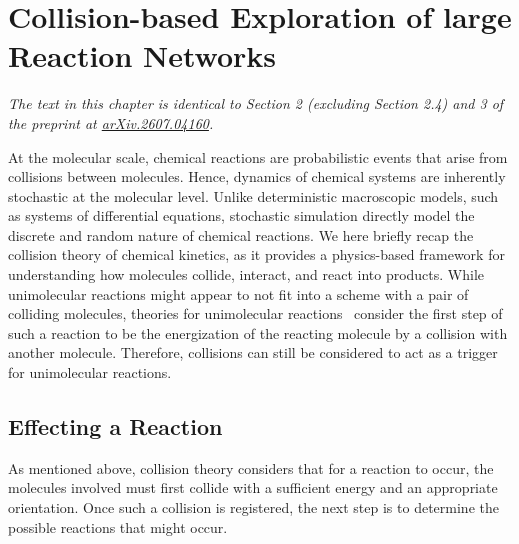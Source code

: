 \chapter[Exploring large Reaction Networks]{Collision-based Exploration of large Reaction Networks}
\label{ch:stoc_explore} %

{\sffamily\slshape The text in this chapter is identical to Section 2 (excluding Section 2.4) and 3 of the preprint at \href{https://arxiv.org/abs/2504.10609}{arXiv.2607.04160}.\\}

At the molecular scale, chemical reactions are probabilistic events that arise from collisions between molecules. Hence, dynamics of chemical systems are inherently stochastic at the molecular level. Unlike deterministic macroscopic models, such as systems of differential equations, stochastic simulation directly model the discrete and random nature of chemical reactions. We here briefly recap the collision theory of chemical kinetics, as it provides a physics-based framework for understanding how molecules collide, interact, and react into products. While unimolecular reactions might appear to not fit into a scheme with a pair of colliding molecules, theories for unimolecular reactions~\cite{unimolecularReaction} consider the first step of such a reaction to be the energization of the reacting molecule by a collision with another molecule. Therefore, collisions can still be considered to act as a trigger for unimolecular reactions.

\section{Effecting a Reaction}
\label{reaction_enumerate}

As mentioned above, collision theory considers that for a reaction to occur, the molecules involved must first collide with a sufficient energy and an appropriate orientation. Once such a collision is registered, the next step is to determine the possible reactions that might occur.

